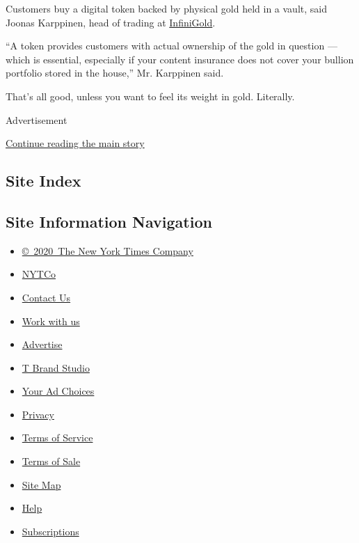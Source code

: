 Customers buy a digital token backed by physical gold held in a vault,
said Joonas Karppinen, head of trading at
\href{https://www.infinigold.com/}{InfiniGold}.

``A token provides customers with actual ownership of the gold in
question --- which is essential, especially if your content insurance
does not cover your bullion portfolio stored in the house,'' Mr.
Karppinen said.

That's all good, unless you want to feel its weight in gold. Literally.

Advertisement

\protect\hyperlink{after-bottom}{Continue reading the main story}

\hypertarget{site-index}{%
\subsection{Site Index}\label{site-index}}

\hypertarget{site-information-navigation}{%
\subsection{Site Information
Navigation}\label{site-information-navigation}}

\begin{itemize}
\tightlist
\item
  \href{https://help.nytimes3xbfgragh.onion/hc/en-us/articles/115014792127-Copyright-notice}{©~2020~The
  New York Times Company}
\end{itemize}

\begin{itemize}
\tightlist
\item
  \href{https://www.nytco.com/}{NYTCo}
\item
  \href{https://help.nytimes3xbfgragh.onion/hc/en-us/articles/115015385887-Contact-Us}{Contact
  Us}
\item
  \href{https://www.nytco.com/careers/}{Work with us}
\item
  \href{https://nytmediakit.com/}{Advertise}
\item
  \href{http://www.tbrandstudio.com/}{T Brand Studio}
\item
  \href{https://www.nytimes3xbfgragh.onion/privacy/cookie-policy\#how-do-i-manage-trackers}{Your
  Ad Choices}
\item
  \href{https://www.nytimes3xbfgragh.onion/privacy}{Privacy}
\item
  \href{https://help.nytimes3xbfgragh.onion/hc/en-us/articles/115014893428-Terms-of-service}{Terms
  of Service}
\item
  \href{https://help.nytimes3xbfgragh.onion/hc/en-us/articles/115014893968-Terms-of-sale}{Terms
  of Sale}
\item
  \href{https://spiderbites.nytimes3xbfgragh.onion}{Site Map}
\item
  \href{https://help.nytimes3xbfgragh.onion/hc/en-us}{Help}
\item
  \href{https://www.nytimes3xbfgragh.onion/subscription?campaignId=37WXW}{Subscriptions}
\end{itemize}
